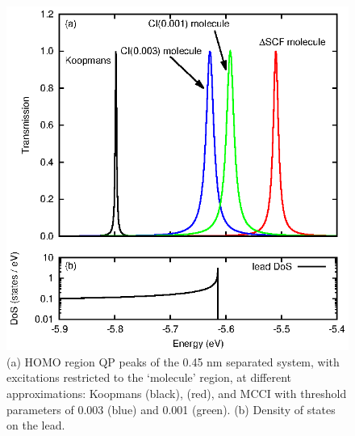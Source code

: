 \begin{figure}
	\begin{center}
		\includegraphics[width=0.9\linewidth]{figures/figure4a_4b}
	\end{center}
	\caption{(a) HOMO region \ac{QP} peaks of the 0.45 nm separated
	         system, with excitations restricted to the `molecule' region,
		 at different approximations: Koopmans (black),
		 \dscf (red), and MCCI with threshold parameters of
		 0.003 (blue) and 0.001 (green). (b) Density of states on the
		 lead.}
	\label{fig:all45Ahomo}
\end{figure}

